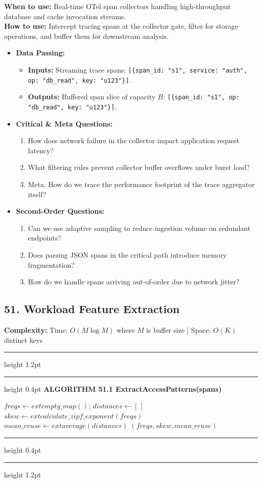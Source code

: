 \documentclass[11pt,a4paper]{article}
\newenvironment{textbookalgo}[2]{%
  \par\addvspace{1.2em}\noindent
  \hrule height 1.2pt
  \vspace{1.5pt}
  \hrule height 0.4pt
  \vspace{5pt}
  {\noindent\large\bfseries\sffamily ALGORITHM #1 \quad #2}
  \par\vspace{5pt}
  \RestyleAlgo{plain}
}{%
  \par\vspace{4pt}
  \hrule height 0.4pt
  \vspace{1.5pt}
  \hrule height 1.2pt
  \par\addvspace{1.2em}
}
\theoremstyle{definition}
\begin{document}
\noindent
\textbf{When to use:} Real-time OTel span collectors handling high-throughput database and cache invocation streams.\\
\textbf{How to use:} Intercept tracing spans at the collector gate, filter for storage operations, and buffer them for downstream analysis.
\begin{itemize}[leftmargin=*]
  \item[] \textbf{Data Passing:}
    \begin{itemize}
      \item \textbf{Inputs:} Streaming trace spans: \texttt{[\{span\_id: "s1", service: "auth", op: "db\_read", key: "u123"\}]}.
      \item \textbf{Outputs:} Buffered span slice of capacity $B$: \texttt{[\{span\_id: "s1", op: "db\_read", key: "u123"\}]}.
    \end{itemize}
  \item[] \textbf{Critical \& Meta Questions:}
  \begin{enumerate}
    \item How does network failure in the collector impact application request latency?
    \item What filtering rules prevent collector buffer overflows under burst load?
    \item Meta: How do we trace the performance footprint of the trace aggregator itself?
  \end{enumerate}
  \item[] \textbf{Second-Order Questions:}
  \begin{enumerate}
    \item Can we use adaptive sampling to reduce ingestion volume on redundant endpoints?
    \item Does parsing JSON spans in the critical path introduce memory fragmentation?
    \item How do we handle spans arriving out-of-order due to network jitter?
  \end{enumerate}
\end{itemize}
\medskip

\clearpage
\subsection{51. Workload Feature Extraction}


\noindent
\textbf{Complexity:} Time: $O(M \log M)$ where $M$ is buffer size | Space: $O(K)$ distinct keys
\smallskip

\begin{textbookalgo}{51.1}{ExtractAccessPatterns(spans)}
\begin{algorithm}[H]
$freqs \leftarrow 	ext{empty\_map}()$; $distances \leftarrow [\,]$\;
$skew \leftarrow 	ext{calculate\_zipf\_exponent}(freqs)$\;
$mean\_reuse \leftarrow 	ext{average}(distances)$\;
\Return $(freqs, skew, mean\_reuse)$\;
\end{algorithm}
\end{textbookalgo}
\end{document}
